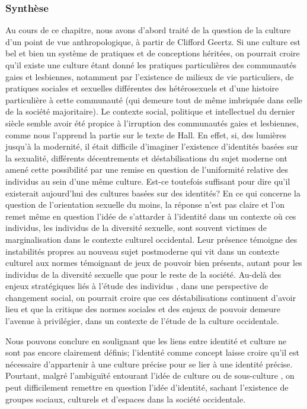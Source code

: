 \subsubsection{Synthèse}
\label{sec:synth_se} 
Au cours de ce chapitre, nous avons d'abord traité de la question de la culture d'un point de vue anthropologique, à partir de Clifford Geertz.
Si une culture est bel et bien un système de pratiques et de conceptions héritées, on pourrait croire qu'il existe une culture \lgbt{} étant donné les pratiques particulières des communautés gaies et lesbiennes, notamment par l'existence de milieux de vie particuliers, de pratiques sociales et sexuelles différentes des hétérosexuels et d'une histoire particulière à cette communauté (qui demeure tout de même imbriquée dans celle de la société majoritaire). 
Le contexte social, politique et intellectuel du dernier siècle semble avoir été propice à l'irruption des communautés gaies et lesbiennes, comme nous l'apprend la partie sur le texte de Hall. 
En effet, si, des lumières jusqu'à la modernité, il était difficile d'imaginer l'existence d'identités basées sur la sexualité, différents décentrements et déstabilisations du sujet moderne ont amené cette possibilité par une remise en question de l'uniformité relative des individus au sein d'une même culture. 
Est-ce toutefois suffisant pour dire qu'il existerait aujourd'hui des cultures basées sur des identités? 
En ce qui concerne la question de l'orientation sexuelle du moins, la réponse n'est pas claire et l'on remet même en question l'idée de s'attarder à l'identité dans un contexte où ces individus, les individus de la diversité sexuelle, sont souvent victimes de marginalisation dans le contexte culturel occidental. 
Leur présence témoigne des instabilités propres au nouveau sujet postmoderne qui vit dans un contexte culturel aux normes témoignant de jeux de pouvoir bien présents, autant pour les individus de la diversité sexuelle que pour le reste de la société. 
Au-delà des enjeux stratégiques liés à l'étude des individus \lgbt{}, dans une perspective de changement social, on pourrait croire que ces déstabilisations continuent d'avoir lieu et que la critique des normes sociales et des enjeux de pouvoir demeure l'avenue à privilégier, dans un contexte de l'étude de la culture occidentale.

Nous pouvons conclure en soulignant que les liens entre identité et culture ne sont pas encore clairement définis; l'identité comme concept laisse croire qu'il est nécessaire d'appartenir à une culture précise pour se lier à une identité précise. 
Pourtant, malgré l'ambiguïté entourant l'idée de culture ou de sous-culture \lgbt{}, on peut difficilement remettre en question l'idée d'identité, sachant l'existence de groupes sociaux, culturels et d'espaces \lgbt{} dans la société occidentale.

